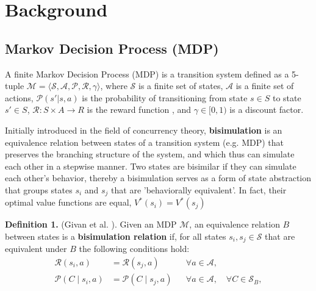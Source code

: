 
\chapter{Background}

\section{Markov Decision Process (MDP)}

A finite Markov Decision Process (MDP) is a transition system defined as a 5-tuple $\mathcal{M} = \langle \mathcal{S}, \mathcal{A}, \mathcal{P}, \mathcal{R}, \gamma \rangle$, where $\mathcal{S}$ is a finite set of states, $\mathcal{A}$ is a finite set of actions, $\mathcal{P}(s'|s, a)$ is the probability of transitioning from state $s \in S$ to state $s' \in S$, $\mathcal{R} : S \times A \rightarrow R$ is the reward function , and $\gamma \in [0, 1)$ is a discount factor.


Initially introduced in the field of concurrency theory, \textbf{bisimulation} \cite{li2006towards, abate2024bisimulation, baier2008principles} is an equivalence relation between states of a transition system (e.g. MDP) that preserves the branching structure of the system, and which thus can simulate each other in a stepwise manner. Two states are bisimilar if they can simulate each other's behavior, thereby a bisimulation serves as a form of state abstraction that groups states \(s_i\) and \(s_j\) that are 'behaviorally equivalent'. In fact, their optimal value functions are equal, \(V^\ast(s_i) = V^\ast(s_j)\)

\textbf{Definition 1.} (Givan et al. \cite{givan2003equivalence}). Given an MDP $\mathcal{M}$, an equivalence relation $B$ between states is a \textbf{bisimulation relation} if, for all states $s_i, s_j \in \mathcal{S}$ that are equivalent under $B$ the following conditions hold:
\begin{equation}
\begin{aligned}
\mathcal{R}\left(s_i, a\right) & =\mathcal{R}\left(s_j, a\right) & & \forall a \in \mathcal{A}, \\
\mathcal{P}\left(C \mid s_i, a\right) & =\mathcal{P}\left(C \mid s_j, a\right) & & \forall a \in \mathcal{A}, \quad \forall C \in \mathcal{S}_B,
\end{aligned}
\end{equation}

